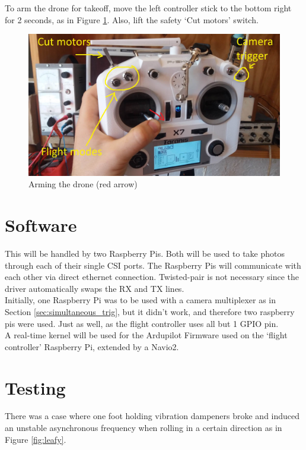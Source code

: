 To arm the drone for takeoff, move the left controller stick to the bottom right for 2 seconds, as in Figure \ref{fig:taranis_arm}. Also, lift the safety `Cut motors' switch.

\begin{figure}[H]
\centering
\includegraphics[scale=0.17]{images/taranis_arm.jpg}
\caption{Arming the drone (red arrow)}
\label{fig:taranis_arm}
\end{figure}

\section{Software}

This will be handled by two Raspberry Pis. Both will be used to take photos through each of their single CSI ports. The Raspberry Pis will communicate with each other via direct ethernet connection. Twisted-pair is not necessary since the driver automatically swaps the RX and TX lines.\\

Initially, one Raspberry Pi was to be used with a camera multiplexer as in Section \ref{sec:simultaneous_trig}, but it didn't work, and therefore two raspberry pis were used. Just as well, as the flight controller uses all but 1 GPIO pin.\\

A real-time kernel will be used for the Ardupilot Firmware used on the `flight controller' Raspberry Pi, extended by a Navio2. \\

\section{Testing}

There was a case where one foot holding vibration dampeners broke and induced an unstable asynchronous frequency when rolling in a certain direction as in Figure \ref{fig:leafy}.


